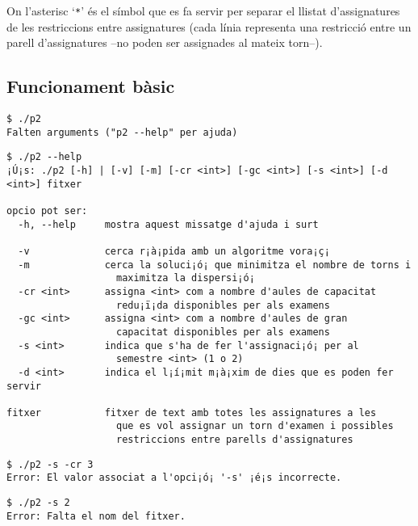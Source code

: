 \documentclass[10pt,a4paper]{../documents/class_material_assignatura_udg}
\begin{document}
On l'asterisc `\texttt{*}' és el símbol que es fa servir per separar el llistat d'assignatures de les restriccions entre assignatures (cada línia representa una restricció entre un parell d'assignatures --no poden ser assignades al mateix torn--).

\subsection{Funcionament bàsic}

\begin{lstlisting}[style=codibash]
$ ./p2
Falten arguments ("p2 --help" per ajuda)
\end{lstlisting}

\begin{lstlisting}[style=codibash]
$ ./p2 --help
¡Ú¡s: ./p2 [-h] | [-v] [-m] [-cr <int>] [-gc <int>] [-s <int>] [-d <int>] fitxer

opcio pot ser:
  -h, --help     mostra aquest missatge d'ajuda i surt

  -v             cerca r¡à¡pida amb un algoritme vora¡ç¡
  -m             cerca la soluci¡ó¡ que minimitza el nombre de torns i 
                   maximitza la dispersi¡ó¡
  -cr <int>      assigna <int> com a nombre d'aules de capacitat
                   redu¡ï¡da disponibles per als examens
  -gc <int>      assigna <int> com a nombre d'aules de gran
                   capacitat disponibles per als examens
  -s <int>       indica que s'ha de fer l'assignaci¡ó¡ per al
                   semestre <int> (1 o 2)
  -d <int>       indica el l¡í¡mit m¡à¡xim de dies que es poden fer servir

fitxer           fitxer de text amb totes les assignatures a les
                   que es vol assignar un torn d'examen i possibles
                   restriccions entre parells d'assignatures
\end{lstlisting}

\begin{lstlisting}[style=codibash]
$ ./p2 -s -cr 3
Error: El valor associat a l'opci¡ó¡ '-s' ¡é¡s incorrecte.
\end{lstlisting}



\begin{lstlisting}[style=codibash]
$ ./p2 -s 2
Error: Falta el nom del fitxer.
\end{lstlisting}
\end{document}
